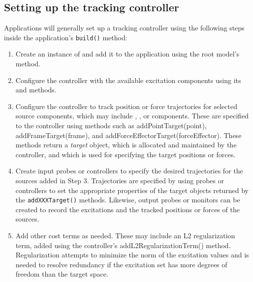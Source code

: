 \subsection{Setting up the tracking controller}
\label{SettingUpController:sec}

Applications will generally set up a tracking controller using the following
steps inside the application's {\tt build()} method:

\begin{enumerate}

\item Create an instance of 
 and add it to the application
using the root model's
 method.

\item Configure the controller with the available excitation components 
using its
and
methods.

\item Configure the controller to track position or force
trajectories for selected source components, which may include
,
,
or 
components. These are specified to the controller using methods such as
%
{addPointTarget(point)},
%
{addFrameTarget(frame)},
and 
%
{addForceEffectorTarget(forceEffector)}. These methods return a {\it target}
object, which is allocated and maintained by the controller, and which is used
for specifying the target positions or forces.

\item Create input probes or controllers to specify the desired
trajectories for the sources added in Step 3. Trajectories are specified by
using probes or controllers to set the appropriate properties of the
target objects returned by the {\tt addXXXTarget()} methods.  Likewise, output
probes or monitors can be created to record the excitations and the tracked
positions or forces of the sources.

\item Add other cost terms as needed. These may include
an L2 regularization term, added using the controller's
%
{addL2RegularizationTerm()} method. Regularization attempts to minimize the norm
of the excitation values and is needed to resolve redundancy if the excitation
set has more degrees of freedom than the target space.


\end{enumerate}

